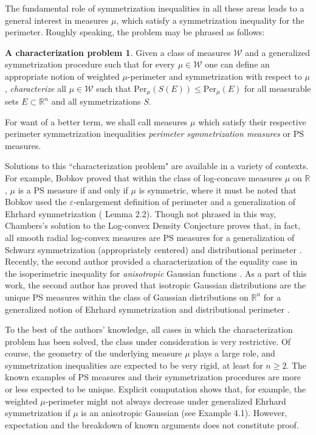 \documentclass[12pt]{amsart}
\numberwithin{equation}{section}
\theoremstyle{plain}
\theoremstyle{definition}
\newtheorem{characterizationproblem}[theorem]{A characterization problem}
\begin{document}
The fundamental role of symmetrization inequalities in all these areas leads to a general interest in measures $\mu$, which satisfy a symmetrization inequality for the perimeter.  Roughly speaking, the problem may be phrased as follows:
\begin{characterizationproblem}
    Given a class of measures $\mathscr{W}$ and a generalized symmetrization procedure such that for every $\mu \in \mathscr{W}$ one can define an appropriate notion of weighted $\mu$-perimeter and symmetrization with respect to $\mu$, \textit{characterize} all $\mu \in \mathscr{W}$ such that $\text{Per}_{\mu}(S(E)) \le \text{Per}_{\mu}(E)$
    for all measurable sets $E \subset \mathbb{R}^n$ and all symmetrizations $S$.
\end{characterizationproblem}
For want of a better term, we shall call measures $\mu$ which satisfy their respective perimeter symmetrization inequalities \textit{perimeter symmetrization measures} or PS measures.

Solutions to this ``characterization problem" are available in a variety of contexts.  For example, Bobkov proved that within the class of log-concave measures $\mu$ on $\mathbb{R}$, $\mu$ is a PS measure if and only if $\mu$ is symmetric, where it must be noted that Bobkov used the $\varepsilon$-enlargement definition of perimeter and a generalization of Ehrhard symmetrization (\cite{Bobkov96} Lemma 2.2).  Though not phrased in this way, Chambers's solution to the Log-convex Density Conjecture proves that, in fact, all smooth radial log-convex measures are PS measures for a generalization of Schwarz symmetrization (appropriately centered) and distributional perimeter \cite{Chambers19}.  Recently, the second author provided a characterization of the equality case in the isoperimetric inequality for \textit{anisotropic} Gaussian functions \cite{Yeh2023}.  As a part of this work, the second author has proved that isotropic Gaussian distributions are the unique PS measures within the class of Gaussian distributions on $\mathbb{R}^n$ for a generalized notion of Ehrhard symmetrization and distributional perimeter \cite{Yeh2023}.

To the best of the authors' knowledge, all cases in which the characterization problem has been solved, the class under consideration is very restrictive.  Of course, the geometry of the underlying measure $\mu$ plays a large role, and symmetrization inequalities are expected to be very rigid, at least for $n \ge 2$.  The known examples of PS measures and their symmetrization procedures are more or less expected to be unique.  Explicit computation shows that, for example, the weighted $\mu$-perimeter might not always decrease under generalized Ehrhard symmetrization if $\mu$ is an anisotropic Gaussian (see \cite{Yeh2023} Example 4.1).  However, expectation and the breakdown of known arguments does not constitute proof.  
\end{document}
